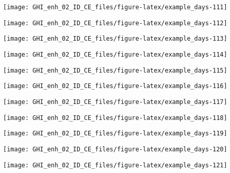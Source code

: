 \documentclass[
  10pt,
  a4paper,oneside]{article}
\begin{document}
\begin{center}\texttt{[image: GHI\_enh\_02\_ID\_CE\_files/figure-latex/example\_days-111]} \end{center}

\begin{center}\texttt{[image: GHI\_enh\_02\_ID\_CE\_files/figure-latex/example\_days-112]} \end{center}

\begin{center}\texttt{[image: GHI\_enh\_02\_ID\_CE\_files/figure-latex/example\_days-113]} \end{center}

\begin{center}\texttt{[image: GHI\_enh\_02\_ID\_CE\_files/figure-latex/example\_days-114]} \end{center}

\begin{center}\texttt{[image: GHI\_enh\_02\_ID\_CE\_files/figure-latex/example\_days-115]} \end{center}

\begin{center}\texttt{[image: GHI\_enh\_02\_ID\_CE\_files/figure-latex/example\_days-116]} \end{center}

\begin{center}\texttt{[image: GHI\_enh\_02\_ID\_CE\_files/figure-latex/example\_days-117]} \end{center}

\begin{center}\texttt{[image: GHI\_enh\_02\_ID\_CE\_files/figure-latex/example\_days-118]} \end{center}

\begin{center}\texttt{[image: GHI\_enh\_02\_ID\_CE\_files/figure-latex/example\_days-119]} \end{center}

\begin{center}\texttt{[image: GHI\_enh\_02\_ID\_CE\_files/figure-latex/example\_days-120]} \end{center}

\begin{center}\texttt{[image: GHI\_enh\_02\_ID\_CE\_files/figure-latex/example\_days-121]} \end{center}
\end{document}
